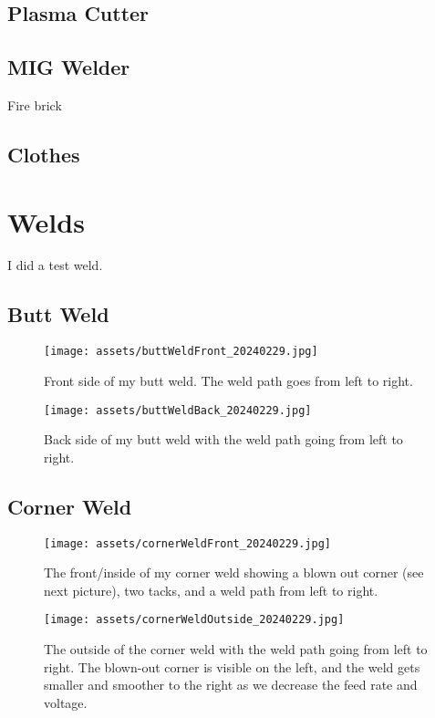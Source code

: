 \documentclass{article}
\begin{document}
\subsection*{Plasma Cutter}

\subsection*{MIG Welder}

Fire brick

\subsection*{Clothes}

\section*{Welds}

I did a test weld.

\subsection*{Butt Weld}

\begin{figure}[h]
\caption{Front side of my butt weld. The weld path goes from left to right.}
\texttt{[image: assets/buttWeldFront\_20240229.jpg]}
\end{figure}

\begin{figure}[h]
\caption{Back side of my butt weld with the weld path going from left to right.}
\texttt{[image: assets/buttWeldBack\_20240229.jpg]}
\end{figure}

\subsection*{Corner Weld}

\begin{figure}[h]
\caption{The front/inside of my corner weld showing a blown out corner (see next picture), two tacks, and a weld path from left to right.}
\texttt{[image: assets/cornerWeldFront\_20240229.jpg]}
\end{figure}

\begin{figure}[h]
\caption{The outside of the corner weld with the weld path going from left to right. The blown-out corner is visible on the left, and the weld gets smaller and smoother to the right as we decrease the feed rate and voltage.}
\texttt{[image: assets/cornerWeldOutside\_20240229.jpg]}
\end{figure}
\end{document}
